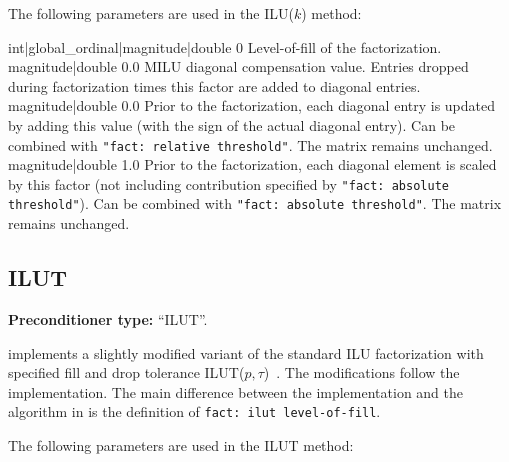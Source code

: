 The following parameters are used in the ILU($k$) method:

    {int|global\_ordinal|magnitude|double}
    {0}
    {Level-of-fill of the factorization.}
    {magnitude|double}
    {0.0}
    {MILU diagonal compensation value. Entries dropped during factorization
     times this factor are added to diagonal entries.}
    {magnitude|double}
    {0.0}
    {Prior to the factorization, each diagonal entry is updated by adding
     this value (with the sign of the actual diagonal entry). Can be combined
     with {\tt "fact: relative threshold"}. The matrix remains unchanged.}
    {magnitude|double}
    {1.0}
    {Prior to the factorization, each diagonal element is scaled by this factor
     (not including contribution specified by {\tt "fact: absolute
     threshold"}). Can be combined with {\tt "fact: absolute threshold"}.
     The matrix remains unchanged.}
%
%
%
%

\subsection{ILUT}\label{s:ILUT}

\textbf{Preconditioner type:} ``ILUT''.

\ifpacktwo{} implements a slightly modified variant of the standard ILU factorization with specified fill and
drop tolerance ILUT($p,\tau$)~\cite{Saad1994}. The modifications follow the \aztecoo implementation.
The main difference between the \ifpacktwo implementation and the algorithm in \cite{Saad1994} is the definition of
\texttt{fact: ilut level-of-fill}.

The following parameters are used in the ILUT method:

